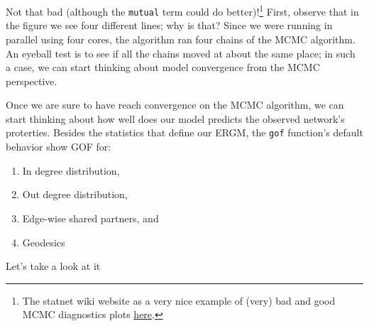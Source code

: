 \documentclass[
]{book}
\providecommand{\tightlist}{%
  \setlength{\itemsep}{0pt}\setlength{\parskip}{0pt}}
\begin{document}
Not that bad (although the \texttt{mutual} term could do better)!\footnote{The statnet wiki website as a very nice example of (very) bad and good MCMC diagnostics plots \href{https://statnet.org/trac/raw-attachment/wiki/Resources/ergm.fit.diagnostics.pdf}{here}.} First, observe that in the figure we see four different lines; why is that? Since we were running in parallel using four cores, the algorithm ran four chains of the MCMC algorithm. An eyeball test is to see if all the chains moved at about the same place; in such a case, we can start thinking about model convergence from the MCMC perspective.

Once we are sure to have reach convergence on the MCMC algorithm, we can start thinking about how well does our model predicts the observed network's proterties. Besides the statistics that define our ERGM, the \texttt{gof} function's default behavior show GOF for:

\begin{enumerate}
\def\labelenumi{\alph{enumi}.}
\tightlist
\item
  In degree distribution,
\item
  Out degree distribution,
\item
  Edge-wise shared partners, and
\item
  Geodesics
\end{enumerate}

Let's take a look at it
\end{document}
